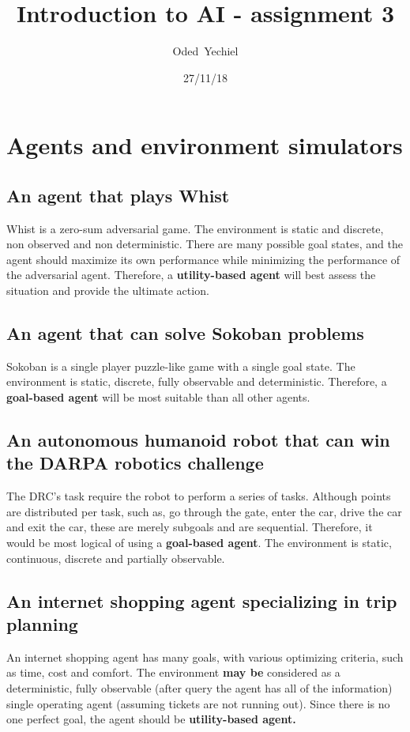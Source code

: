 \documentclass{article}                     %
\begin{document}
	
	\title{Introduction to AI - assignment 3}
	
	
	\author{Oded~Yechiel}
	
	\date{27/11/18}
	
	\maketitle
	\tableofcontents
	\section{Agents and environment simulators}
	\subsection{An agent that plays Whist}
	Whist is a zero-sum adversarial game. The environment is static and discrete, non observed and non deterministic. There are many possible goal states, and the agent should maximize its own performance while minimizing the performance of the adversarial agent. Therefore, a \textbf{utility-based agent} will best assess the situation and provide the ultimate action.
	\subsection{An agent that can solve Sokoban problems}
	Sokoban is a single player puzzle-like game with a single goal state. The environment is static, discrete, fully observable and deterministic. Therefore, a \textbf{goal-based agent} will be most suitable than all other agents.
	\subsection{An autonomous humanoid robot that can win the DARPA robotics challenge}
	The DRC's task require the robot to perform a series of tasks. Although points are distributed per task, such as, go through the gate, enter the car, drive the car and exit the car, these are merely subgoals and are sequential. Therefore, it would be most logical of using a \textbf{goal-based agent}. The environment is static, continuous, discrete and partially observable.
	\subsection{An internet shopping agent specializing in trip planning}
	An internet shopping agent has many goals, with various optimizing criteria, such as time, cost and comfort. The environment \textbf{may be} considered as a deterministic, fully observable (after query the agent has all of the information) single operating agent (assuming tickets are not running out). Since there is no one perfect goal, the agent should be \textbf{utility-based agent.}
\end{document}
